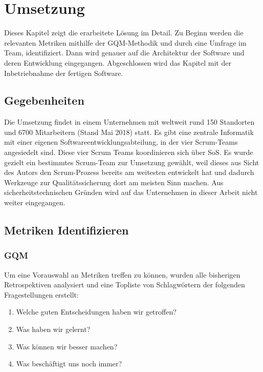 \chapter{Umsetzung}

Dieses Kapitel zeigt die erarbeitete Lösung im Detail.
Zu Beginn werden die relevanten Metriken mithilfe der \ac{GQM}-Methodik und durch eine Umfrage im Team, identifiziert.
Dann wird genauer auf die Architektur der Software und deren Entwicklung einge\-gang\-en.
Abgeschlossen wird das Kapitel mit der Inbetriebnahme der fertigen Software.

\section{Gegebenheiten}

Die Umsetzung findet in einem Unternehmen mit weltweit rund 150 Standorten und 6700 Mitarbeitern (Stand Mai 2018) statt.
Es gibt eine zentrale Informatik mit einer eigenen Softwareentwicklungsabteilung, in der vier Scrum-Teams angesiedelt sind.
Diese vier Scrum Teams koordinieren sich über \ac{SoS}.
Es wurde gezielt ein bestimmtes Scrum-Team zur Umsetzung gewählt, weil dieses aus Sicht des Autors den Scrum-Prozess bereits am weitesten entwickelt hat und dadurch Werkzeuge zur Qualitätssicherung dort am meisten Sinn machen.
Aus sicherheitstechnischen Gründen wird auf das Unternehmen in dieser Arbeit nicht weiter eingegangen.

\section{Metriken Identifizieren}

\subsection{\ac{GQM}}

Um eine Vorauswahl an Metriken treffen zu können, wurden alle bisherigen Retrospektiven analysiert und eine Topliste von Schlagwörtern der folgenden Fragestellungen erstellt:
\begin{enumerate}
    \item Welche guten Entscheidungen haben wir getroffen?
    \item Was haben wir gelernt?
    \item Was können wir besser machen?
    \item Was beschäftigt uns noch immer?
\end{enumerate}

